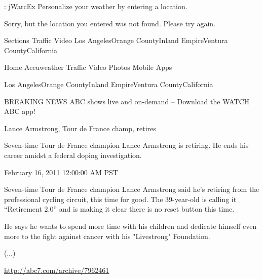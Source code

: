 \documentclass[12pt, utf8, ngerman]{beamer}
\begin{document}
\begin{frame}{\insertsection: jWarcEx}
    \scriptsize
    Personalize your weather by entering a location.

    Sorry, but the location you entered was not found. Please try again.

    \vspace{.2cm}
    Sections Traffic Video Los AngelesOrange CountyInland EmpireVentura CountyCalifornia

    Home Accuweather Traffic Video Photos Mobile Apps

    Los AngelesOrange CountyInland EmpireVentura CountyCalifornia

    \quad BREAKING NEWS ABC shows live and on-demand -- Download the WATCH ABC app!

    \vspace{.2cm}
    Lance Armstrong, Tour de France champ, retires

    Seven-time Tour de France champion Lance Armstrong is retiring. He ends his career amidst a federal doping investigation.

    February 16, 2011 12:00:00 AM PST

    Seven-time Tour de France champion Lance Armstrong said he's retiring from the professional cycling circuit, this time for good. The 39-year-old is calling it ``Retirement 2.0'' and is making it clear there is no reset button this time.

    \vspace{.2cm}
    He says he wants to spend more time with his children and dedicate himself even more to the fight against cancer with his "Livestrong" Foundation.

    (...)

    \vspace{.2cm}
    \url{http://abc7.com/archive/7962461}
\end{frame}
\end{document}
